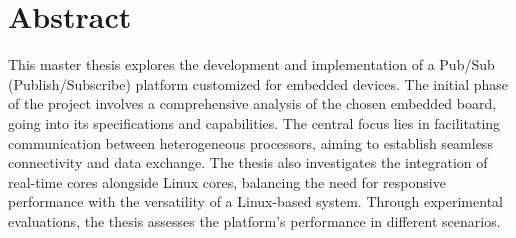 \chapter*{Abstract}

This master thesis explores the development and implementation of a Pub/Sub
(Publish/Subscribe) platform customized for embedded devices.
The initial phase of the project involves a comprehensive analysis of the
chosen embedded board, going into its specifications and capabilities.
The central focus lies in facilitating communication between heterogeneous
processors, aiming to establish seamless connectivity and data exchange.
The thesis also investigates the integration of real-time cores alongside Linux
cores, balancing the need for responsive performance with the versatility of
a Linux-based system. 
Through experimental evaluations, the thesis assesses the platform's
performance in different scenarios. 
